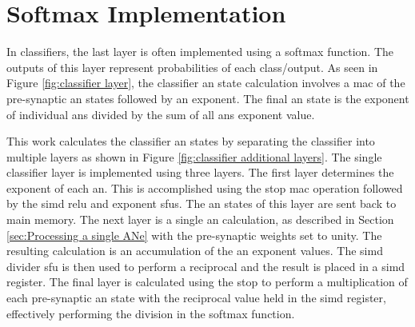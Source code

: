 
\chapter{Softmax Implementation}
\label{sec:Appendix-A}
\label{sec:Softmax Implementation}

In classifiers, the last layer is often implemented using a softmax \cite{wikipedia_softmax}\cite{stanford_softmax} function.
The outputs of this layer represent probabilities of each class/output.
As seen in Figure \ref{fig:classifier layer}, the classifier \ac{an} state calculation involves a \ac{mac} of the pre-synaptic \ac{an} states followed by an exponent.
The final \ac{an} state is the exponent of individual \acp{an} divided by the sum of all \acp{an} exponent value.

This work calculates the classifier \ac{an} states by separating the classifier into multiple layers as shown in Figure \ref{fig:classifier additional layers}.
The single classifier layer is implemented using three layers.
The first layer determines the exponent of each \ac{an}. This is accomplished using the \ac{stop} \ac{mac} operation followed by the \ac{simd} \ac{relu} and exponent \acp{sfu}.
The \ac{an} states of this layer are sent back to main memory.
The next layer is a single \ac{an} calculation, as described in Section \ref{sec:Processing a single ANe} with the pre-synaptic weights set to unity.
The resulting calculation is an accumulation of the \ac{an} exponent values.
The \ac{simd} divider \ac{sfu} is then used to perform a reciprocal and the result is placed in a \ac{simd} register.
The final layer is calculated using the \ac{stop} to perform a multiplication of each pre-synaptic \ac{an} state with the reciprocal value held in the \ac{simd} register, effectively performing the division in the softmax function.

